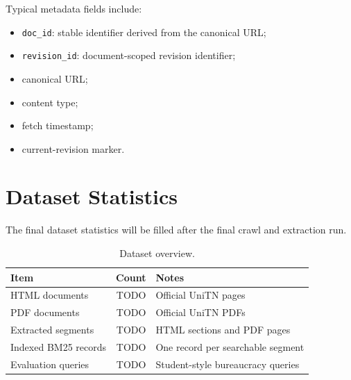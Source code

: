 Typical metadata fields include:

\begin{itemize}
    \item \texttt{doc\_id}: stable identifier derived from the canonical URL;
    \item \texttt{revision\_id}: document-scoped revision identifier;
    \item canonical URL;
    \item content type;
    \item fetch timestamp;
    \item current-revision marker.
\end{itemize}

\section{Dataset Statistics}
The final dataset statistics will be filled after the final crawl and extraction run.

\begin{table}[h]
\centering
\begin{tabular}{lrl}
\toprule
\textbf{Item} & \textbf{Count} & \textbf{Notes} \\
\midrule
HTML documents & TODO & Official UniTN pages \\
PDF documents & TODO & Official UniTN PDFs \\
Extracted segments & TODO & HTML sections and PDF pages \\
Indexed BM25 records & TODO & One record per searchable segment \\
Evaluation queries & TODO & Student-style bureaucracy queries \\
\bottomrule
\end{tabular}
\caption{Dataset overview.}
\label{tab:dataset-overview}
\end{table}
\par
